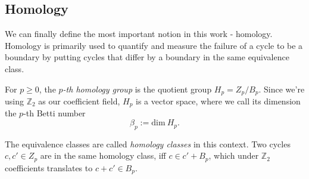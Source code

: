\subsection{Homology}

We can finally define the most important notion in this work - homology. Homology is primarily used to quantify and measure the failure of a cycle to be a boundary by putting cycles that differ by a boundary in the same equivalence class.

\begin{definition}
  For $p \geq 0$, the \textit{$p$-th homology group} is the quotient group $H_{p} = Z_{p} / B_{p}$. Since we're using $\mathbb{Z}_{2}$ as our coefficient field, $H_{p}$ is a vector space, where we call its dimension the $p$-th Betti number
  \begin{equation*}
    \beta_{p} := \text{dim} \: H_{p}.
  \end{equation*}
\end{definition}

The equivalence classes are called \textit{homology classes} in this context. Two cycles $c, c' \in Z_{p}$ are in the same homology class, iff $c \in c' + B_{p}$, which under $\mathbb{Z}_{2}$ coefficients translates to $c + c' \in B_{p}$.
